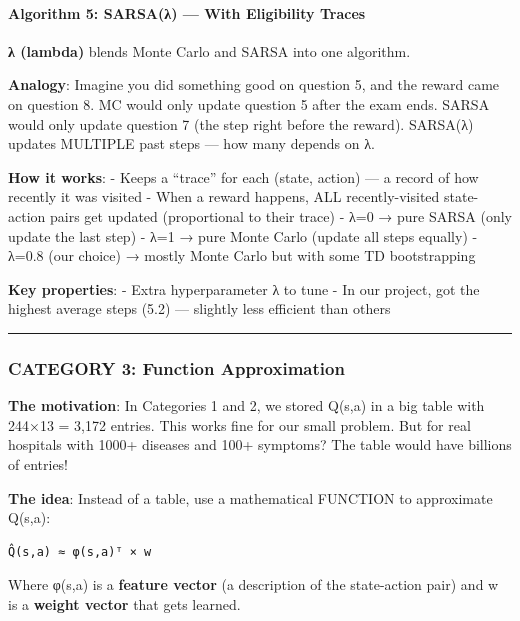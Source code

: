 \documentclass[
]{article}
\begin{document}
\hypertarget{algorithm-5-sarsaux3bb-with-eligibility-traces}{%
\paragraph{Algorithm 5: SARSA(λ) --- With Eligibility
Traces}\label{algorithm-5-sarsaux3bb-with-eligibility-traces}}

\textbf{λ (lambda)} blends Monte Carlo and SARSA into one algorithm.

\textbf{Analogy}: Imagine you did something good on question 5, and the
reward came on question 8. MC would only update question 5 after the
exam ends. SARSA would only update question 7 (the step right before the
reward). SARSA(λ) updates MULTIPLE past steps --- how many depends on λ.

\textbf{How it works}: - Keeps a ``trace'' for each (state, action) ---
a record of how recently it was visited - When a reward happens, ALL
recently-visited state-action pairs get updated (proportional to their
trace) - λ=0 → pure SARSA (only update the last step) - λ=1 → pure Monte
Carlo (update all steps equally) - λ=0.8 (our choice) → mostly Monte
Carlo but with some TD bootstrapping

\textbf{Key properties}: - Extra hyperparameter λ to tune - In our
project, got the highest average steps (5.2) --- slightly less efficient
than others

\begin{center}\rule{0.5\linewidth}{0.5pt}\end{center}

\hypertarget{category-3-function-approximation}{%
\subsubsection{CATEGORY 3: Function
Approximation}\label{category-3-function-approximation}}

\textbf{The motivation}: In Categories 1 and 2, we stored Q(s,a) in a
big table with 244×13 = 3,172 entries. This works fine for our small
problem. But for real hospitals with 1000+ diseases and 100+ symptoms?
The table would have billions of entries!

\textbf{The idea}: Instead of a table, use a mathematical FUNCTION to
approximate Q(s,a):

\begin{verbatim}
Q̂(s,a) ≈ φ(s,a)ᵀ × w
\end{verbatim}

Where φ(s,a) is a \textbf{feature vector} (a description of the
state-action pair) and w is a \textbf{weight vector} that gets learned.
\end{document}

